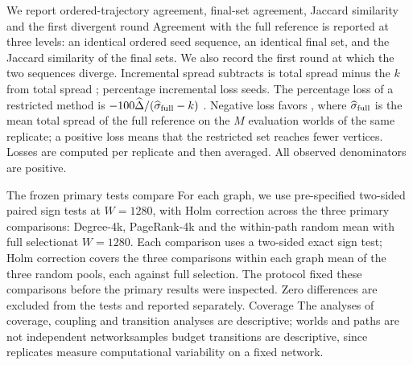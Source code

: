 \documentclass[smallextended]{svjour3}
\providecommand{\DIFaddtex}[1]{{\protect\color{blue} \sf #1}} %
\providecommand{\DIFdeltex}[1]{{\protect\color{red} \scriptsize #1}} %
\providecommand{\DIFaddbegin}{} %
\providecommand{\DIFaddend}{} %
\providecommand{\DIFdelbegin}{} %
\providecommand{\DIFdelend}{} %
\providecommand{\DIFadd}[1]{\texorpdfstring{\DIFaddtex{#1}}{#1}} %
\providecommand{\DIFdel}[1]{\texorpdfstring{\DIFdeltex{#1}}{}} %
\providecommand{\DIFscaledelfig}{0.5}
\newlength{\DIFdelgraphicswidth} %
\newlength{\DIFdelgraphicsheight} %
\providecommand{\DIFaddincludegraphics}[2][]{{\color{blue}\fbox{\DIFOincludegraphics[#1]{#2}}}} %
\providecommand{\DIFdelincludegraphics}[2][]{%
\sbox{\DIFdelgraphicsbox}{\DIFOincludegraphics[#1]{#2}}%
\settoboxwidth{\DIFdelgraphicswidth}{\DIFdelgraphicsbox} %
\settoboxtotalheight{\DIFdelgraphicsheight}{\DIFdelgraphicsbox} %
\scalebox{\DIFscaledelfig}{%
\parbox[b]{\DIFdelgraphicswidth}{\usebox{\DIFdelgraphicsbox}\\[-\baselineskip] \rule{\DIFdelgraphicswidth}{0em}}\llap{\resizebox{\DIFdelgraphicswidth}{\DIFdelgraphicsheight}{%
\setlength{\unitlength}{\DIFdelgraphicswidth}%
\begin{picture}(1,1)%
\thicklines\linethickness{2pt} %
{\color[rgb]{1,0,0}\put(0,0){\framebox(1,1){}}}%
{\color[rgb]{1,0,0}\put(0,0){\line( 1,1){1}}}%
{\color[rgb]{1,0,0}\put(0,1){\line(1,-1){1}}}%
\end{picture}%
}\hspace*{3pt}}} %
} %
\DeclareRobustCommand{\DIFaddbegin}{\DIFOaddbegin \let\includegraphics\DIFaddincludegraphics} %
\DeclareRobustCommand{\DIFaddend}{\DIFOaddend \let\includegraphics\DIFOincludegraphics} %
\DeclareRobustCommand{\DIFdelbegin}{\DIFOdelbegin \let\includegraphics\DIFdelincludegraphics} %
\DeclareRobustCommand{\DIFdelend}{\DIFOaddend \let\includegraphics\DIFOincludegraphics} %
\begin{document}
\DIFdelbegin \DIFdel{We report ordered-trajectory agreement, final-set agreement, Jaccard similarity and the first divergent round }\DIFdelend \DIFaddbegin \DIFadd{Agreement with the full reference is reported at three levels: an identical ordered seed sequence, an identical final set, and the Jaccard similarity of the final sets. We also record the first round at which the two sequences diverge}\DIFaddend . Incremental spread \DIFdelbegin \DIFdel{subtracts }\DIFdelend \DIFaddbegin \DIFadd{is total spread minus the }\DIFaddend $k$ \DIFdelbegin \DIFdel{from total spread ; percentage incremental loss }\DIFdelend \DIFaddbegin \DIFadd{seeds. The percentage loss of a restricted method }\DIFaddend is $-100\widehat\Delta/(\widehat\sigma_{\rm full}-k)$\DIFdelbegin \DIFdel{. Negative loss favors }\DIFdelend \DIFaddbegin \DIFadd{, where $\widehat\sigma_{\rm full}$ is the mean total spread of the full reference on the $M$ evaluation worlds of the same replicate; a positive loss means that }\DIFaddend the restricted set \DIFaddbegin \DIFadd{reaches fewer vertices. Losses are computed per replicate and then averaged}\DIFaddend .
\DIFdelbegin \DIFdel{All observed denominators are positive.
}\DIFdelend 

\DIFdelbegin \DIFdel{The frozen primary tests compare }\DIFdelend \DIFaddbegin \DIFadd{For each graph, we use pre-specified two-sided paired sign tests at $W=1280$, with Holm correction across the three primary comparisons: }\DIFaddend Degree-4k, PageRank-4k and the \DIFdelbegin \DIFdel{within-path random mean with full selectionat $W=1280$. Each comparison uses a two-sided exact sign test; Holm correction covers the three comparisons within each graph}\DIFdelend \DIFaddbegin \DIFadd{mean of the three random pools, each against full selection}\DIFaddend . \DIFaddbegin \DIFadd{The protocol fixed these comparisons before the primary results were inspected. }\DIFaddend Zero differences are excluded from the tests and reported separately. \DIFdelbegin \DIFdel{Coverage}\DIFdelend \DIFaddbegin \DIFadd{The analyses of coverage}\DIFaddend , coupling and \DIFdelbegin \DIFdel{transition analyses are descriptive; worlds and paths are not independent networksamples}\DIFdelend \DIFaddbegin \DIFadd{budget transitions are descriptive, since replicates measure computational variability on a fixed network}\DIFaddend .
\end{document}
